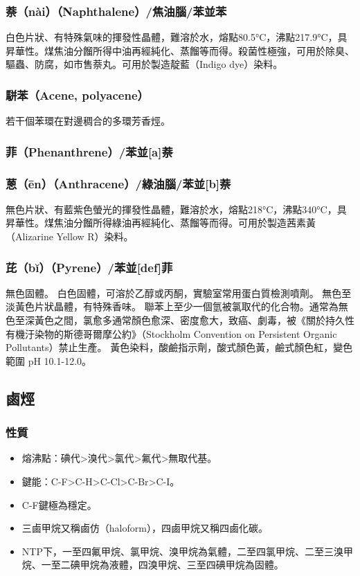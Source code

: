 \documentclass[a4paper,12pt]{report}
\begin{document}
\begin{itemize}
\subsubsection{萘（nài）（Naphthalene）/焦油腦/苯並苯}
白色片狀、有特殊氣味的揮發性晶體，難溶於水，熔點80.5°C，沸點217.9°C，具昇華性。煤焦油分餾所得中油再經純化、蒸餾等而得。殺菌性極強，可用於除臭、驅蟲、防腐，如市售萘丸。可用於製造靛藍（Indigo dye）染料。
\subsubsection{駢苯（Acene, polyacene）}
若干個苯環在對邊稠合的多環芳香烴。
\subsubsection{菲（Phenanthrene）/苯並[a]萘}
\subsubsection{蒽（ēn）（Anthracene）/綠油腦/苯並[b]萘}
無色片狀、有藍紫色螢光的揮發性晶體，難溶於水，熔點218°C，沸點340°C，具昇華性。煤焦油分餾所得綠油再經純化、蒸餾等而得。可用於製造茜素黃（Alizarine Yellow R）染料。
\subsubsection{芘（bĭ）（Pyrene）/苯並[def]菲}
無色固體。
白色固體，可溶於乙醇或丙酮，實驗室常用蛋白質檢測噴劑。
無色至淡黃色片狀晶體，有特殊香味。
聯苯上至少一個氫被氯取代的化合物。通常為無色至深黃色之間，氯愈多通常顏色愈深、密度愈大，致癌、劇毒，被《關於持久性有機汙染物的斯德哥爾摩公約》（Stockholm Convention on Persistent Organic Pollutants）禁止生產。
黃色染料，酸鹼指示劑，酸式顏色黃，鹼式顏色紅，變色範圍 pH 10.1-12.0。
\subsection{鹵烴}
\subsubsection{性質}
\begin{itemize}
\item 熔沸點：碘代>溴代>氯代>氟代>無取代基。
\item 鍵能：C-F>C-H>C-Cl>C-Br>C-I。
\item C-F鍵極為穩定。
\item 三鹵甲烷又稱鹵仿（haloform），四鹵甲烷又稱四鹵化碳。
\item NTP下，一至四氟甲烷、氯甲烷、溴甲烷為氣體，二至四氯甲烷、二至三溴甲烷、一至二碘甲烷為液體，四溴甲烷、三至四碘甲烷為固體。
\end{itemize}

\end{itemize}
\end{document}
